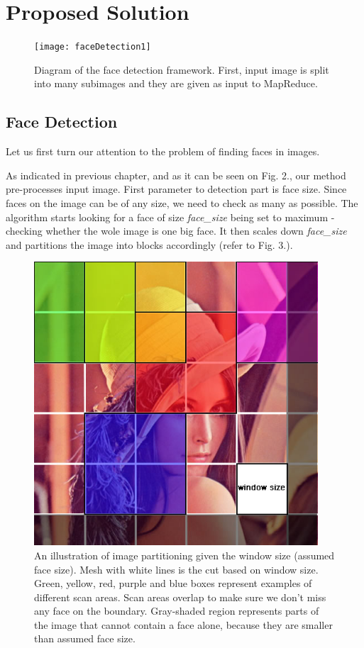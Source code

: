 \documentclass[11pt, draftclsnofoot, onecolumn]{IEEEtran}
\begin{document}
\section{Proposed Solution} \label{sec:solution}

\begin{figure}
\centering
\texttt{[image: faceDetection1]}
\caption{Diagram of the face detection framework. First, input image is split into many subimages and they are given as input to MapReduce.}
\end{figure}

\subsection{Face Detection}
Let us first turn our attention to the problem of finding faces in images.

As indicated in previous chapter, and as it can be seen on Fig. 2., our method pre-processes input image. First parameter to detection part is face size. Since faces on the image can be of any size, we need to check as many as possible. The algorithm starts looking for a face of size \emph{face\_size} being set to maximum - checking whether the wole image is one big face. It then scales down \emph{face\_size} and partitions the image into blocks accordingly (refer to Fig. 3.).

\begin{figure}[t!]
\centering
\includegraphics[width=300pt, height=300pt]{img1}
\caption{An illustration of image partitioning given the window size (assumed face size). Mesh with white lines is the cut based on window size. Green, yellow, red, purple and blue boxes represent examples of different scan areas. Scan areas overlap to make sure we don't miss any face on the boundary. Gray-shaded region represents parts of the image that cannot contain a face alone, because they are smaller than assumed face size.}
\end{figure}
\end{document}
